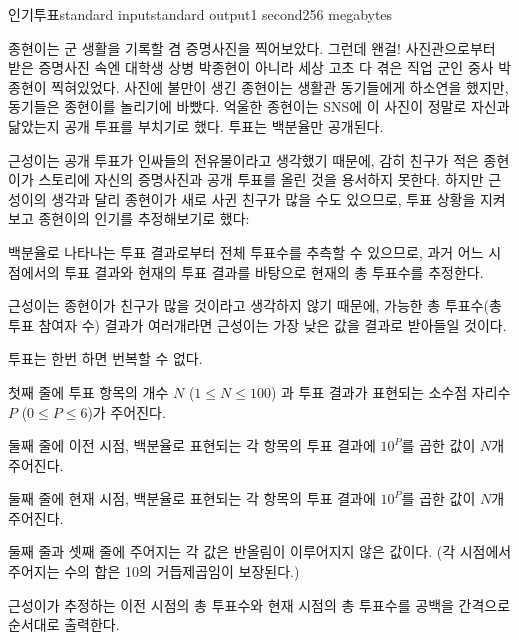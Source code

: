 \begin{problem}{인기투표}{standard input}{standard output}{1 second}{256 megabytes}

종현이는 군 생활을 기록할 겸 증명사진을 찍어보았다. 그런데 왠걸! 사진관으로부터 받은 증명사진 속엔 대학생 상병 박종현이 아니라 세상 고초 다 겪은 직업 군인 중사 박종현이 찍혀있었다. 사진에 불만이 생긴 종현이는 생활관 동기들에게 하소연을 했지만, 동기들은 종현이를 놀리기에 바빴다. 억울한 종현이는 SNS에 이 사진이 정말로 자신과 닮았는지 공개 투표를 부치기로 했다. 투표는 백분율만 공개된다.

근성이는 공개 투표가 인싸들의 전유물이라고 생각했기 때문에, 감히 친구가 적은 종현이가 스토리에 자신의 증명사진과 공개 투표를 올린 것을 용서하지 못한다. 하지만 근성이의 생각과 달리 종현이가 새로 사귄 친구가 많을 수도 있으므로, 투표 상황을 지켜보고 종현이의 인기를 추정해보기로 했다:

백분율로 나타나는 투표 결과로부터 전체 투표수를 추측할 수 있으므로, 과거 어느 시점에서의 투표 결과와 현재의 투표 결과를 바탕으로 현재의 총 투표수를 추정한다.

근성이는 종현이가 친구가 많을 것이라고 생각하지 않기 때문에, 가능한 총 투표수(총 투표 참여자 수) 결과가 여러개라면 근성이는 가장 낮은 값을 결과로 받아들일 것이다.

투표는 한번 하면 번복할 수 없다.

\InputFile
첫째 줄에 투표 항목의 개수 $N$ ($1\leq N\leq100$) 과 투표 결과가 표현되는 소수점 자리수 $P$ ($0\leq P\leq6$)가 주어진다.

둘째 줄에 이전 시점, 백분율로 표현되는 각 항목의 투표 결과에 $10^P$를 곱한 값이 $N$개 주어진다.

둘째 줄에 현재 시점, 백분율로 표현되는 각 항목의 투표 결과에 $10^P$를 곱한 값이 $N$개 주어진다.

둘째 줄과 셋째 줄에 주어지는 각 값은 반올림이 이루어지지 않은 값이다. (각 시점에서 주어지는 수의 합은 10의 거듭제곱임이 보장된다.)

\OutputFile
근성이가 추정하는 이전 시점의 총 투표수와 현재 시점의 총 투표수를 공백을 간격으로 순서대로 출력한다.

\Examples

\begin{example}
%
%
\end{example}

\end{problem}

